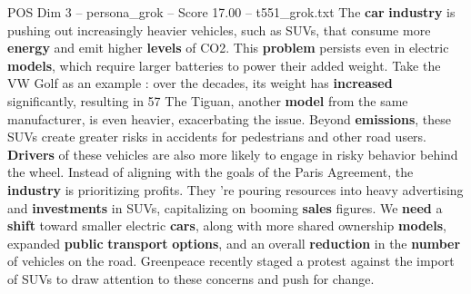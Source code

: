 \begin{textsample}{POS Dim 3 – persona\_grok – Score 17.00 – t551\_grok.txt}  \label{ex:f3_pos_037}
The \textbf{car} \textbf{industry} is pushing out increasingly heavier vehicles, such as SUVs, that consume more \textbf{energy} and emit higher \textbf{levels} of CO2.
This \textbf{problem} persists even in electric \textbf{models}, which require larger batteries to power their added weight.
Take the VW Golf as an example : over the decades, its weight has \textbf{increased} significantly, resulting in 57 %
The Tiguan, another \textbf{model} from the same manufacturer, is even heavier, exacerbating the issue.
Beyond \textbf{emissions}, these SUVs create greater risks in accidents for pedestrians and other road users. \textbf{Drivers} of these vehicles are also more likely to engage in risky behavior behind the wheel.
Instead of aligning with the goals of the Paris Agreement, the \textbf{industry} is prioritizing profits.
They 're pouring resources into heavy advertising and \textbf{investments} in SUVs, capitalizing on booming \textbf{sales} figures.
We \textbf{need} a \textbf{shift} toward smaller electric \textbf{cars}, along with more shared ownership \textbf{models}, expanded \textbf{public} \textbf{transport} \textbf{options}, and an overall \textbf{reduction} in the \textbf{number} of vehicles on the road.
Greenpeace recently staged a protest against the import of SUVs to draw attention to these concerns and push for change.

\end{textsample}
